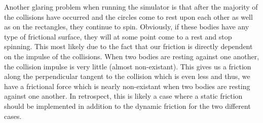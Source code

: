 \documentclass[a4paper,12pt]{report}
\begin{document}
Another glaring problem when running the simulator is that after the majority of the collisions have occurred and the circles come to rest upon each other as well as on the rectangles, they continue to spin. Obviously, if these bodies have any type of frictional surface, they will at some point come to a rest and stop spinning. This most likely due to the fact that our friction is directly dependent on the impulse of the collisions. When two bodies are resting against one another, the collision impulse is very little (almost non-existant). This gives us a friction along the perpendicular tangent to the collision which is even less and thus, we have a frictional force which is nearly non-existant when two bodies are resting against one another. In retrospect, this is likely a case where a static friction should be implemented in addition to the dynamic friction for the two different cases.






\end{document}
